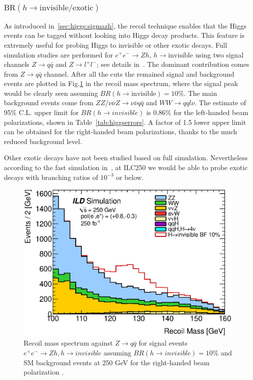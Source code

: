 \subsubsection{$\mathrm{BR}(h\to \mathrm{invisible/exotic})$}
\label{sec:higgs:invisible}
As introduced in~\ref{sec:higgs:sigmazh}, the recoil technique enables that 
the Higgs events can be tagged without looking into Higgs decay products. 
This feature is extremely useful for probing Higgs to invisible or other exotic decays.
Full simulation studies are performed for $e^+e^-\to Zh$, $h\to\mathrm{invisible}$
using two signal channels $Z\to q\bar{q}$ and $Z\to l^+l^-$; 
see details in~\cite{Ishikawa:2014,Tian:2015,Kato:2016}. The dominant contribution comes
from $Z\to q\bar{q}$ channel. After all the cuts the remained signal and background events 
are plotted in Fig.\ref{fig:qqHinv250} in the recoil mass spectrum, where the signal
peak would be clearly seen assuming $BR(h\to\mathrm{invisible})=10\%$. 
The main background events come from $ZZ/\nu\bar{\nu}Z\to\nu\bar{\nu}q\bar{q}$ 
and $WW\to qql\nu$.
The estimate of 95\% C.L. upper limit for $BR(h\to invisible)$
is 0.86\% for the left-handed beam polarizations, shown in Table~\ref{tab:higgserrors}. 
A factor of 1.5 lower upper limit can be obtained for the right-handed beam polarizations,
thanks to the much reduced background level.

Other exotic decays have not been studied based on full simulation. Nevertheless
according to the fast simulation in~\cite{Liu:2016zki}, at ILC250 we would be able 
to probe exotic decays with branching ratios of $10^{-3}$ or below.

\begin{figure}
\begin{center}
\includegraphics[width=0.85\hsize]{chapters/figures/ZH_qqinv250_right.eps}
\end{center}
  \caption{Recoil mass spectrum against
 $Z\to q\bar{q}$ for signal events $e^+e^-\to Zh, h\to invisible$ assuming $BR(h\to invisible)=10\%$
  and SM background events at 250 GeV for the right-handed beam polarization \cite{Ishikawa:2014}.}
  \label{fig:qqHinv250}
\end{figure}

